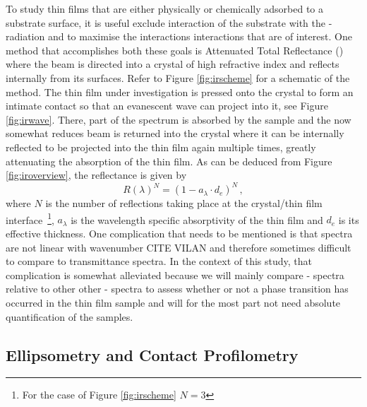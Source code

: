 To study thin films that are either physically or chemically adsorbed to a substrate surface, it is useful exclude interaction of the substrate with the \ir{}-radiation and to maximise the interactions interactions that are of interest. One method that accomplishes  both these goals is Attenuated Total Reflectance (\atr{}) \ftir{} where the \ir{} beam is directed into a crystal of high refractive index and reflects internally from its surfaces. Refer to Figure \ref{fig:irscheme} for a schematic of the \atr{} method. The thin film under investigation is pressed onto the crystal to form an intimate contact so that an evanescent \ir{} wave can project into it, see Figure \ref{fig:irwave}. There, part of the \ir{} spectrum is absorbed by the sample and the now somewhat reduces beam is returned into the crystal where it can be internally reflected to be projected into the thin film again multiple times, greatly attenuating the absorption of the thin film. As can be deduced from Figure \ref{fig:iroverview}, the reflectance is given by
\begin{equation}
\label{atr-reflectance}
	R(\lambda)^N = (1-a_{\lambda} \cdot d_e)^N \, ,
\end{equation}
where $N$ is the number of reflections taking place at the crystal/thin film interface~\footnote{For the case of Figure \ref{fig:irscheme} $N=3$}, $a_{\lambda}$ is the wavelength specific absorptivity of the thin film and $d_e$ is its effective thickness. One complication that needs to be mentioned is that \atr{} spectra are not linear with wavenumber CITE VILAN and therefore sometimes difficult to compare to transmittance spectra. In the context of this study, that complication is somewhat alleviated because we will mainly compare \atr{}-\ftir{} spectra relative to other other \atr{}-\ftir{} spectra to assess whether or not a phase transition has occurred in the thin film sample and will for the most part not need absolute quantification of the samples.
\subsection{Ellipsometry and Contact Profilometry}

